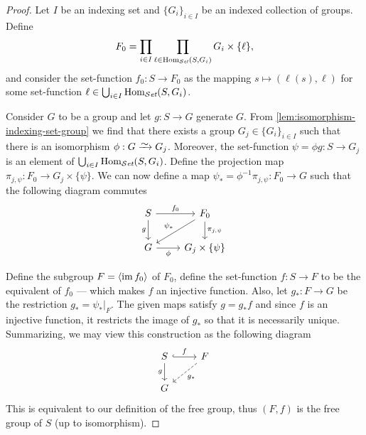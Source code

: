 \begin{proof}
  Let \(I\) be an indexing set and \(\{G_{i}\}_{i \in I}\) be an indexed
  collection of groups. Define
  \[
    F_0 = \prod_{i \in I} \prod_{\ell \in \operatorname{Hom}_{{\mathcal{S}\textit{et}}}(S, G_i)} G_i \times \{\ell\},
  \]
  and consider the set-function \(f_0: S \to F_0\) as the mapping \(s \mapsto (\ell(s),
  \ell)\) for some set-function \(\ell \in \bigcup_{i \in I} \operatorname{Hom}_{{\mathcal{S}\textit{et}}}(S, G_i)\).

  Consider \(G\) to be a group and let \(g: S \to G\) generate \(G\). From
  \cref{lem:isomorphism-indexing-set-group} we find that there exists a group
  \(G_j \in \{G_{i}\}_{i \in I}\) such that there is an isomorphism \(\phi: G \isoto
  G_{j}\). Moreover, the set-function \(\psi = \phi g: S \to G_j\) is an element of
  \(\bigcup_{i \in I} \operatorname{Hom}_{{\mathcal{S}\textit{et}}}(S, G_i)\). Define the projection map \(\pi_{j, \psi}: F_0 \to
  G_j \times \{\psi\}\). We can now define a map \(\psi_{*} = \phi^{-1} \pi_{j, \psi}: F_0 \to G\)
  such that the following diagram commutes
  \[
    \begin{tikzcd}
      S \ar[r, "f_0"] \ar[d, swap, "g"] &F_0 \ar[d, "\pi_{j, \psi}"]
      \ar[dl, swap, "\psi_{*}"] \\
      G \ar[r, swap, "\phi"] &G_j \times \{\psi\}
    \end{tikzcd}
  \]

  Define the subgroup \(F = \left\langle \operatorname{im} f_{0} \right\rangle\) of \(F_0\), define the
  set-function \(f: S \to F\) to be the equivalent of \(f_0\) --- which makes \(f\)
  an injective function. Also, let \(g_{*}: F \to G\) be the restriction \(g_{*} =
  \psi_{*}|_{F}\). The given maps satisfy \(g = g_{*} f\) and since \(f\) is an
  injective function, it restricts the image of \(g_{*}\) so that it is
  necessarily unique. Summarizing, we may view this construction as the following
  diagram
  \[
    \begin{tikzcd}
      S \ar[r, hook, "f"] \ar[d, swap, "g"] &F \ar[dl, dashed, "g_{*}"] \\
      G &
    \end{tikzcd}
  \]
  This is equivalent to our definition of the free group, thus \((F, f)\) is the
  free group of \(S\) (up to isomorphism).
\end{proof}


